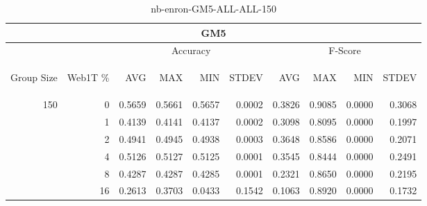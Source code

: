 \begin{center}
\begin{table}[htbp]
\begin{tabular}{ | r | r | r | r | r | r | r | r | r | r |}
\hline
\multicolumn{10}{|c|}{GM5}\\
\hline
 & & \multicolumn{4}{|c|}{Accuracy} & \multicolumn{4}{|c|}{F-Score}\\ \cline{3-10}
\begin{sideways}Group Size\end{sideways} & \begin{sideways}Web1T \%\end{sideways} & \begin{sideways}AVG\end{sideways} & \begin{sideways}MAX\end{sideways} & \begin{sideways}MIN\end{sideways} & \begin{sideways}STDEV\end{sideways} & \begin{sideways}AVG\end{sideways} & \begin{sideways}MAX\end{sideways} & \begin{sideways}MIN\end{sideways} & \begin{sideways}STDEV\end{sideways}\\
\hline
\multirow{6}{*}{150}
 & 0 & 0.5659 & 0.5661 & 0.5657 & 0.0002 & 0.3826 & 0.9085 & 0.0000 & 0.3068\\ \cline{2-10}
 & 1 & 0.4139 & 0.4141 & 0.4137 & 0.0002 & 0.3098 & 0.8095 & 0.0000 & 0.1997\\ \cline{2-10}
 & 2 & 0.4941 & 0.4945 & 0.4938 & 0.0003 & 0.3648 & 0.8586 & 0.0000 & 0.2071\\ \cline{2-10}
 & 4 & 0.5126 & 0.5127 & 0.5125 & 0.0001 & 0.3545 & 0.8444 & 0.0000 & 0.2491\\ \cline{2-10}
 & 8 & 0.4287 & 0.4287 & 0.4285 & 0.0001 & 0.2321 & 0.8650 & 0.0000 & 0.2195\\ \cline{2-10}
 & 16 & 0.2613 & 0.3703 & 0.0433 & 0.1542 & 0.1063 & 0.8920 & 0.0000 & 0.1732\\ \cline{2-10}
\hline
\end{tabular}
\caption{nb-enron-GM5-ALL-ALL-150}
\end{table}
\end{center}

